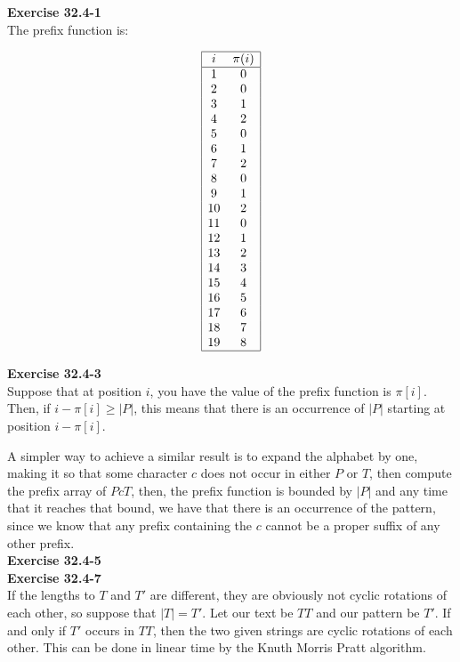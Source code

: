 \documentclass{article}
\begin{document}
\noindent\textbf{Exercise 32.4-1}\\

The prefix function is:

\[
\begin{array}{|cc|}
\hline
i &\pi(i)\\
\hline
1&0\\
2&0\\
3&1\\
4&2\\
5&0\\
6&1\\
7&2\\
8&0\\
9&1\\
10&2\\
11&0\\
12&1\\
13&2\\
14&3\\
15&4\\
16&5\\
17&6\\
18&7\\
19&8\\
\hline
\end{array}
\]




\noindent\textbf{Exercise 32.4-3}\\

Suppose that at position $i$, you have the value of the prefix function is $\pi[i]$. Then, if $i-\pi[i] \ge|P| $, this means that there is an occurrence of $|P|$ starting at position $i-\pi[i]$. 

A simpler way to achieve a similar result is to expand the alphabet by one, making it so that some character $c$ does not occur in either $P$ or $T$, then compute the prefix array of $PcT$, then, the prefix function is bounded by $|P|$ and any time that it reaches that bound, we have that there is an occurrence of the pattern, since we know that any prefix containing the $c$ cannot be a proper suffix of any other prefix.\\


\noindent\textbf{Exercise 32.4-5}\\





\noindent\textbf{Exercise 32.4-7}\\

If the lengths to $T$ and $T'$ are different, they are obviously not cyclic rotations of each other, so suppose that $|T|=T'$. Let our text be $TT$ and our pattern be $T'$. If and only if $T'$ occurs in $TT$, then the two given strings are cyclic rotations of each other. This can be done in linear time by the Knuth Morris Pratt algorithm.
\end{document}
